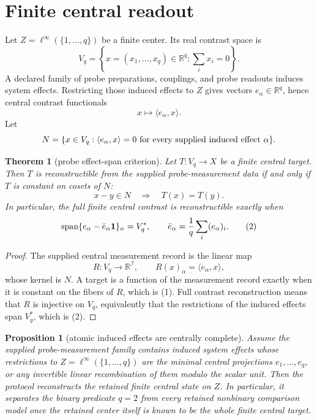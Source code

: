 \documentclass[12pt]{article}
\newtheorem{theorem}{Theorem}
\newtheorem{proposition}{Proposition}
\theoremstyle{remark}
\newcommand{\R}{\mathbb R}
\newcommand{\Span}{\operatorname{span}}
\newcommand{\I}{\mathcal I}
\begin{document}
\section{Finite central readout}

Let \(Z=\ell^\infty(\{1,\ldots,q\})\) be a finite center.  Its real contrast
space is
\[
  V_q=\left\{x=(x_1,\ldots,x_q)\in\R^q:\sum_i x_i=0\right\}.
\]
A declared family of probe preparations, couplings, and probe readouts induces
system effects.  Restricting those induced effects to \(Z\) gives vectors
\(e_\alpha\in\R^q\), hence central contrast functionals
\[
  x\longmapsto \langle e_\alpha,x\rangle .
\]
Let
\[
  N=\{x\in V_q:\langle e_\alpha,x\rangle=0
       \hbox{ for every supplied induced effect }\alpha\}.
\]

\begin{theorem}[probe effect-span criterion]
\label{thm:effect-span}
Let \(T:V_q\to X\) be a finite central target.  Then \(T\) is reconstructible
from the supplied probe-measurement data if and only if \(T\) is constant on
cosets of \(N\):
\[
  x-y\in N\quad\Longrightarrow\quad T(x)=T(y).
  \tag{1}
\]
In particular, the full finite central contrast is reconstructible exactly
when
\[
  \Span\{e_\alpha-\bar e_\alpha{\bf 1}\}_\alpha = V_q^*,
  \qquad
  \bar e_\alpha=\frac1q\sum_i(e_\alpha)_i.
  \tag{2}
\]
\end{theorem}

\begin{proof}
The supplied central measurement record is the linear map
\[
  R:V_q\to\R^\I,\qquad R(x)_\alpha=\langle e_\alpha,x\rangle,
\]
whose kernel is \(N\).  A target is a function of the measurement record
exactly when it is constant on the fibers of \(R\), which is (1).  Full
contrast reconstruction means that \(R\) is injective on \(V_q\), equivalently
that the restrictions of the induced effects span \(V_q^*\), which is (2).
\end{proof}

\begin{proposition}[atomic induced effects are centrally complete]
\label{prop:atomic-effects}
Assume the supplied probe-measurement family contains induced system effects
whose restrictions to \(Z=\ell^\infty(\{1,\ldots,q\})\) are the minimal central
projections \(e_1,\ldots,e_q\), or any invertible linear recombination of them
modulo the scalar unit.  Then the protocol reconstructs the retained finite
central state on \(Z\).  In particular, it separates the binary predicate
\(q=2\) from every retained nonbinary comparison model once the retained center
itself is known to be the whole finite central target.
\end{proposition}
\end{document}
